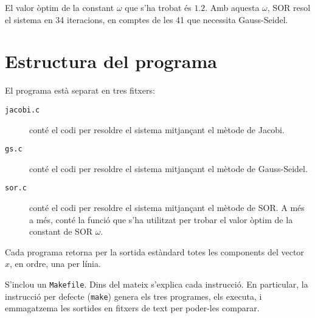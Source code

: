 \documentclass[12pt]{article}
\begin{document}
El valor òptim de la constant $\omega$ que s'ha trobat és $1.2$.
Amb aquesta $\omega$, SOR resol el sistema en 34 iteracions, en comptes de les 41
que necessita Gauss-Seidel.

\section{Estructura del programa}
El programa està separat en tres fitxers:

\begin{description}
\item [\texttt{jacobi.c}] conté el codi per resoldre el sistema mitjançant el
  mètode de Jacobi.
\item [\texttt{gs.c}] conté el codi per resoldre el sistema mitjançant el
  mètode de Gauss-Seidel.
\item [\texttt{sor.c}] conté el codi per resoldre el sistema mitjançant el
  mètode de SOR. A més a més, conté la funció que s'ha utilitzat per trobar
  el valor òptim de la constant de SOR $\omega$.
\end{description}

Cada programa retorna per la sortida estàndard totes les components del vector
$x$, en ordre, una per línia.

S'inclou un \texttt{Makefile}. Dins del mateix s'explica cada instrucció.
En particular, la instrucció per defecte (\texttt{make}) genera els tres
programes, els executa, i emmagatzema les sortides en fitxers de text per
poder-les comparar.
\end{document}
